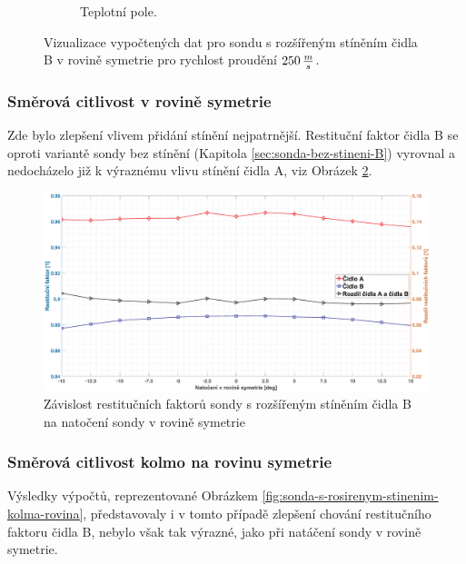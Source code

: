 \begin{figure}[ht!]
\begin{subfigure}{0.45\textwidth}
                    \caption{Teplotní pole.}
                \end{subfigure}
                \caption{Vizualizace vypočtených dat pro sondu s rozšířeným stíněním čidla B v rovině symetrie pro rychlost proudění $250 \, \frac{m}{s}$.}
                \label{fig:sonda-s-rozsirenym-stinenim-B-vizualizace}
            \end{figure}
        \newpage
        \subsubsection{Směrová citlivost v rovině symetrie}
            Zde bylo zlepšení vlivem přidání stínění nejpatrnější. Restituční faktor čidla B se oproti variantě sondy bez stínění (Kapitola \ref{sec:sonda-bez-stineni-B}) vyrovnal a nedocházelo již k výraznému vlivu stínění čidla A, viz Obrázek \ref{fig:sonda-s-rosirenym-stinenim-rovina-symetrie}.
            
            \begin{figure}[ht!]
                \centering
                \includegraphics*[width=\textwidth]{400_SIMULACE_KONSTRUKCNICH_UPRAV/Grafy/03_rovina_symetrie}
                \caption{Závislost restitučních faktorů sondy s rozšířeným stíněním čidla B na natočení sondy v rovině symetrie}
                \label{fig:sonda-s-rosirenym-stinenim-rovina-symetrie}
            \end{figure}
        \subsubsection{Směrová citlivost kolmo na rovinu symetrie}
            Výsledky výpočtů, reprezentované Obrázkem \ref{fig:sonda-s-rosirenym-stinenim-kolma-rovina}, představovaly i v tomto případě zlepšení chování restitučního faktoru čidla B, nebylo však tak výrazné, jako při natáčení sondy v rovině symetrie.
            
